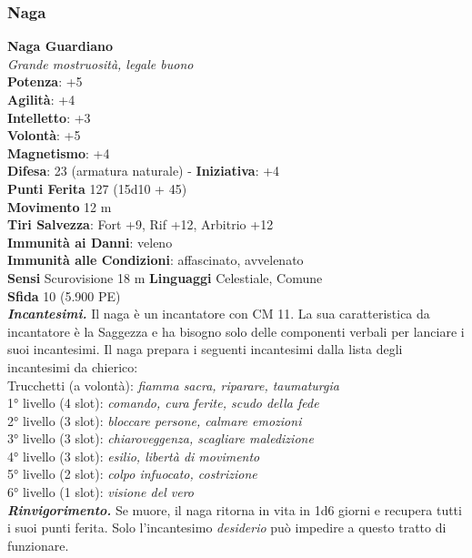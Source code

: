 \begin{multicols}{2}
\subsubsection{Naga}

\medskip\textbf{Naga Guardiano}\\
\emph{Grande mostruosità, legale buono}\\
\textbf{Potenza}: +5\\
\textbf{Agilità}: +4\\
\textbf{Intelletto}: +3\\
\textbf{Volontà}: +5\\
\textbf{Magnetismo}: +4\\
\textbf{Difesa}: 23 (armatura naturale) - \textbf{Iniziativa}: +4\\
\textbf{Punti Ferita} 127 (15d10 + 45)\\
\textbf{Movimento} 12 m\\
\textbf{Tiri Salvezza}: Fort +9, Rif +12, Arbitrio +12\\
\textbf{Immunità ai Danni}: veleno\\
\textbf{Immunità alle Condizioni}: affascinato, avvelenato\\
\textbf{Sensi} Scurovisione 18 m \textbf{Linguaggi} Celestiale, Comune\\
\textbf{Sfida} 10 (5.900 PE)\smallskip\\
\emph{\textbf{Incantesimi.}} Il naga è un incantatore con CM 11. La sua caratteristica da incantatore è la Saggezza e ha bisogno solo delle componenti verbali per lanciare i suoi incantesimi. Il naga prepara i seguenti incantesimi dalla lista degli incantesimi da chierico:\\
Trucchetti (a volontà): \emph{fiamma sacra, riparare, taumaturgia}\\
1° livello (4 slot): \emph{comando, cura ferite, scudo della fede}\\
2° livello (3 slot): \emph{bloccare persone, calmare emozioni}\\
3° livello (3 slot): \emph{chiaroveggenza, scagliare maledizione}\\
4° livello (3 slot): \emph{esilio, libertà di movimento}\\
5° livello (2 slot): \emph{colpo infuocato, costrizione}\\
6° livello (1 slot): \emph{visione del vero}\\
\emph{\textbf{Rinvigorimento.}} Se muore, il naga ritorna in vita in 1d6 giorni e recupera tutti i suoi punti ferita. Solo l'incantesimo \emph{desiderio} può impedire a questo tratto di funzionare.\\

\end{multicols}
